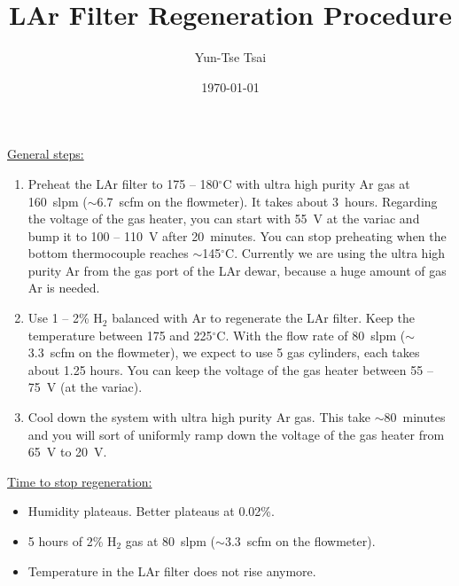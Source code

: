 \documentclass[letterpaper,11pt]{article}
\newcommand{\Hydro}     {H$_2$}
\newcommand{\dC}        {$^\circ$C}
\begin{document}
\title{\textbf{LAr Filter Regeneration Procedure}}
\author{Yun-Tse Tsai}
\date{\today}

\maketitle

\underline{General steps:}
\begin{enumerate}
\setlength\itemsep{-0.2em}
\item Preheat the LAr filter to 175 -- 180{\dC} with ultra high purity Ar gas at 160~slpm ($\sim$6.7~scfm on the flowmeter).  
It takes about 3~hours.  Regarding the voltage of the gas heater, you can start with 55~V at the variac and bump it 
to 100 -- 110~V after 20~minutes.  
You can stop preheating when the bottom thermocouple reaches $\sim$145{\dC}.
Currently we are using the ultra high purity Ar from the gas port of the LAr dewar, because a huge amount of gas Ar
is needed.
\item Use 1 -- 2\% {\Hydro} balanced with Ar to regenerate the LAr filter.  Keep the temperature between 175 and 225{\dC}.  
With the flow rate of 80~slpm ($\sim$3.3~scfm on the flowmeter), we expect to use 5 gas cylinders, 
each takes about 1.25 hours.  You can keep the voltage of the gas heater between 55 -- 75~V (at the variac).
\item Cool down the system with ultra high purity Ar gas.  
This take $\sim$80~minutes and you will sort of uniformly ramp down the voltage of the gas heater from 65~V to 20~V.
\end{enumerate}

\underline{Time to stop regeneration:}
\begin{itemize}
\setlength\itemsep{-0.2em}
\item Humidity plateaus.  Better plateaus at 0.02\%.
\item 5 hours of 2\% {\Hydro} gas at 80~slpm ($\sim$3.3~scfm on the flowmeter).
\item Temperature in the LAr filter does not rise anymore.
\end{itemize}
\end{document}
